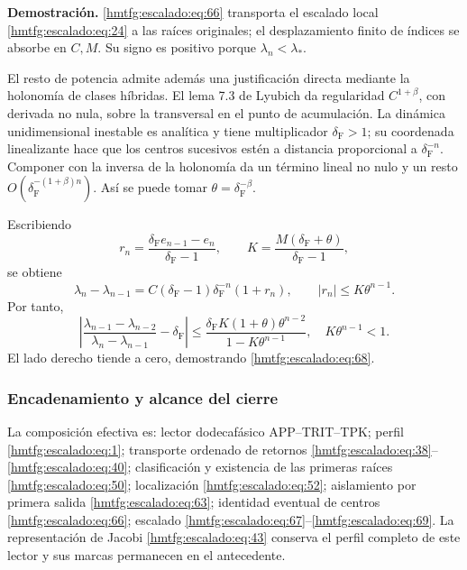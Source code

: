 \textbf{Demostración.} \eqref{hmtfg:escalado:eq:66} transporta el escalado local \eqref{hmtfg:escalado:eq:24} a las raíces originales; el desplazamiento finito de índices se absorbe en \(C,M\). Su signo es positivo porque \(\lambda_n<\lambda_*\).

El resto de potencia admite además una justificación directa mediante la holonomía de clases híbridas. El lema 7.3 de Lyubich da regularidad \(C^{1+\beta}\), con derivada no nula, sobre la transversal en el punto de acumulación. La dinámica unidimensional inestable es analítica y tiene multiplicador \(\delta_{\mathrm F}>1\); su coordenada linealizante hace que los centros sucesivos estén a distancia proporcional a \(\delta_{\mathrm F}^{-n}\). Componer con la inversa de la holonomía da un término lineal no nulo y un resto \(O(\delta_{\mathrm F}^{-(1+\beta)n})\). Así se puede tomar \(\theta=\delta_{\mathrm F}^{-\beta}\).

Escribiendo
\[
r_n=\frac{\delta_{\mathrm F} e_{n-1}-e_n}{\delta_{\mathrm F}-1},
\qquad K=\frac{M(\delta_{\mathrm F}+\theta)}{\delta_{\mathrm F}-1},
\]
se obtiene
\[
\lambda_n-\lambda_{n-1}
=C(\delta_{\mathrm F}-1)\delta_{\mathrm F}^{-n}(1+r_n),\qquad
|r_n|\le K\theta^{n-1}.
\]
Por tanto,
\begin{equation}
\left|
\frac{\lambda_{n-1}-\lambda_{n-2}}
{\lambda_n-\lambda_{n-1}}-\delta_{\mathrm F}
\right|
\le
\frac{\delta_{\mathrm F} K(1+\theta)\theta^{n-2}}
{1-K\theta^{n-1}},
\quad K\theta^{n-1}<1.
\label{hmtfg:escalado:eq:69}
\end{equation}
El lado derecho tiende a cero, demostrando \eqref{hmtfg:escalado:eq:68}.

\subsubsection{Encadenamiento y alcance del cierre}
\label{hmtfg:escalado:17.4}

La composición efectiva es: lector dodecafásico APP–TRIT–TPK; perfil \eqref{hmtfg:escalado:eq:1}; transporte ordenado de retornos \eqref{hmtfg:escalado:eq:38}–\eqref{hmtfg:escalado:eq:40}; clasificación y existencia de las primeras raíces \eqref{hmtfg:escalado:eq:50}; localización \eqref{hmtfg:escalado:eq:52}; aislamiento por primera salida \eqref{hmtfg:escalado:eq:63}; identidad eventual de centros \eqref{hmtfg:escalado:eq:66}; escalado \eqref{hmtfg:escalado:eq:67}–\eqref{hmtfg:escalado:eq:69}. La representación de Jacobi \eqref{hmtfg:escalado:eq:43} conserva el perfil completo de este lector y sus marcas permanecen en el antecedente.

